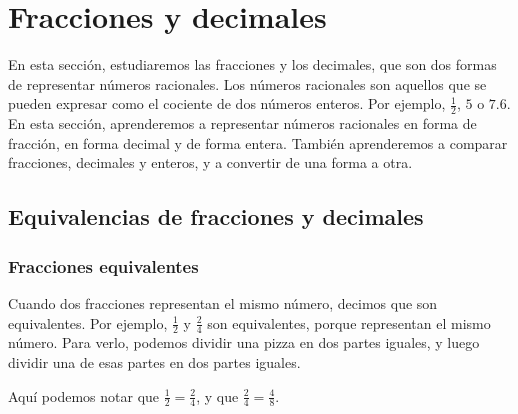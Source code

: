 \thispagestyle{plain}
\section{Fracciones y decimales}
En esta sección, estudiaremos las fracciones y los decimales, que son dos formas de representar números racionales. Los números racionales son aquellos que se pueden expresar como el cociente de dos números enteros. Por ejemplo, $\frac{1}{2}$, $5$ o $7.6$. En esta sección, aprenderemos a representar números racionales en forma de fracción, en forma decimal y de forma entera. También aprenderemos a comparar fracciones, decimales y enteros, y a convertir de una forma a otra.

\subsection{Equivalencias de fracciones y decimales}

\subsubsection{Fracciones equivalentes}
Cuando dos fracciones representan el mismo número, decimos que son equivalentes. Por ejemplo, $\frac{1}{2}$ y $\frac{2}{4}$ son equivalentes, porque representan el mismo número. Para verlo, podemos dividir una pizza en dos partes iguales, y luego dividir una de esas partes en dos partes iguales.

Aquí podemos notar que $\frac{1}{2} = \frac{2}{4}$, y que $\frac{2}{4} = \frac{4}{8}$.

